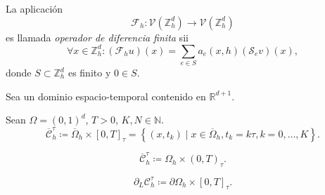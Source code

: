 \begin{definition}
    La aplicación
    \begin{equation*}
        \mathcal{F}_{h}\colon
        \mathcal{V}\left(\mathbb{Z}^{d}_{h}\right)\to
        \mathcal{V}\left(\mathbb{Z}^{d}_{h}\right)
    \end{equation*}
    es llamada \emph{operador de diferencia finita} sii
    \begin{equation*}
        \forall x\in\mathbb{Z}^{d}_{h}:
        \left(\mathcal{F}_{h}u\right)\left(x\right)=
        \sum_{e\in S}
        a_{e}\left(x,h\right)
        \left(\mathcal{S}_{e}v\right)
        \left(x\right),
    \end{equation*}
    donde $S\subset\mathbb{Z}^{d}_{h}$ es finito y $0\in S$.
\end{definition}

Sea un dominio espacio-temporal contenido en $\mathbb{R}^{d+1}$.

\begin{definition}
    Sean
    \begin{math}
        \Omega=
        {\left(0,1\right)}^{d}
    \end{math},
    $T>0$, $K,N\in\mathbb{N}$.
    \begin{equation*}
        \overline{\mathcal{C}}^{\tau}_{h}\coloneqq
        \overline{\Omega}_{h}
        \times
        {\left[0,T\right]}_{\tau}=
        \left\{
        \left(x,t_{k}\right)\mid
        x\in\overline{\Omega}_{h},
        t_{k}=k\tau,
        k=0,\dotsc, K
        \right\}.
    \end{equation*}
\end{definition}

\begin{definition}
    \begin{equation*}
        \overline{\mathcal{C}}^{\tau}_{h}\coloneqq
        \Omega_{h}\times
        {\left(0,T\right)}_{\tau}.
    \end{equation*}
\end{definition}

\begin{definition}
    \begin{equation*}
        \partial_{L}
        \mathcal{C}^{\tau}_{h}\coloneqq
        \partial\Omega_{h}\times
        {\left[0,T\right]}_{\tau}.
    \end{equation*}
\end{definition}

